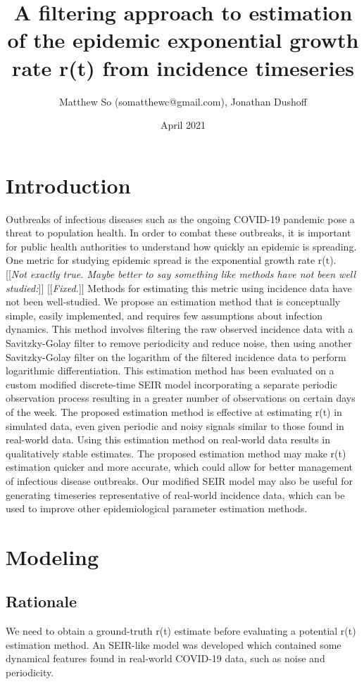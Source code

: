 \documentclass{article}
\title{A filtering approach to estimation of the epidemic exponential growth rate r(t) from incidence timeseries}
\author{Matthew So (somatthewc@gmail.com), Jonathan Dushoff}
\date{April 2021}
\newcommand{\jd}[1]{[[\textsl{#1}]]} %
\newcommand{\msComment}[1]{[[\textsl{#1}]]}
\begin{document}
\maketitle
\tableofcontents

\section{Introduction}
Outbreaks of infectious diseases such as the ongoing COVID-19 pandemic pose a threat to population health. In order to combat these outbreaks, it is important for public health authorities to understand how quickly an epidemic is spreading. One metric for studying epidemic spread is the exponential growth rate r(t). \jd{Not exactly true. Maybe better to say something like methods have not been well studied:} \msComment{Fixed.} Methods for estimating this metric using incidence data have not been well-studied. We propose an estimation method that is conceptually simple,  easily implemented, and requires few assumptions about infection dynamics. This method involves filtering the raw observed incidence data with a Savitzky-Golay filter to remove periodicity and reduce noise, then using another Savitzky-Golay filter on the logarithm of the filtered incidence data to perform logarithmic differentiation. This estimation method has been evaluated on a custom modified discrete-time SEIR model incorporating a separate periodic observation process resulting in a greater number of observations on certain days of the week. The proposed estimation method is effective at estimating r(t) in simulated data, even given periodic and noisy signals similar to those found in real-world data. Using this estimation method on real-world data results in qualitatively stable estimates. The proposed estimation method may make r(t) estimation quicker and more accurate, which could allow for better management of infectious disease outbreaks. Our modified SEIR model may also be useful for generating timeseries representative of real-world incidence data, which can be used to improve other epidemiological parameter estimation methods.

\section{Modeling}

\subsection{Rationale}
We need to obtain a ground-truth r(t) estimate before evaluating a potential r(t) estimation method. An SEIR-like model was developed which contained some dynamical features found in real-world COVID-19 data, such as noise and periodicity.
\end{document}

